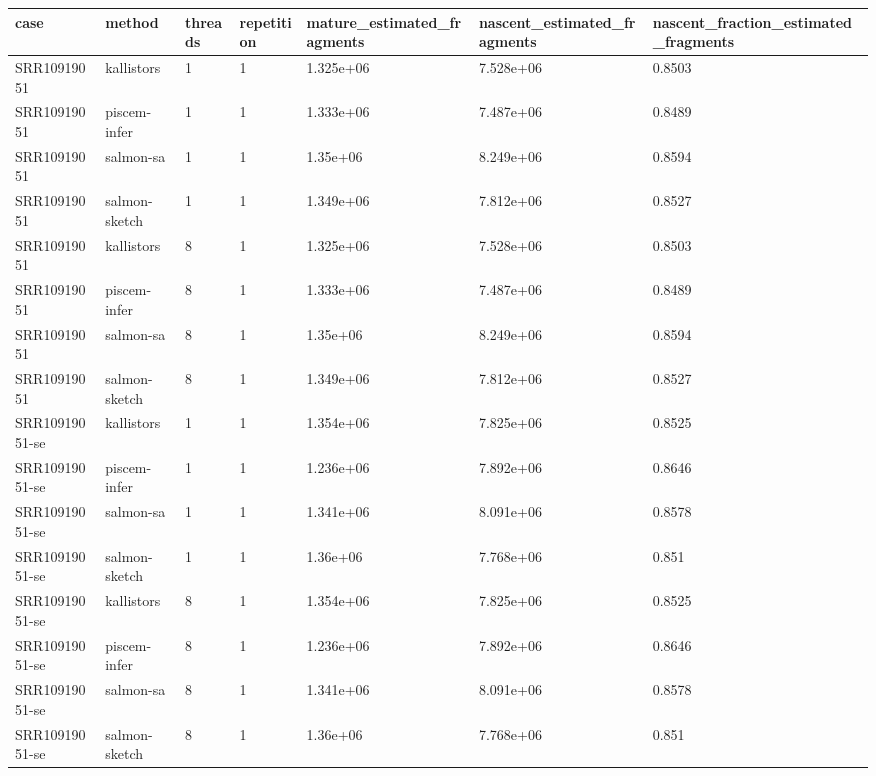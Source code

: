 \begin{tabular}{lllllll}
\toprule
case & method & threads & repetition & mature\_estimated\_fragments & nascent\_estimated\_fragments & nascent\_fraction\_estimated\_fragments \\
\midrule
SRR10919051 & kallistors & 1 & 1 & 1.325e+06 & 7.528e+06 & 0.8503 \\
SRR10919051 & piscem-infer & 1 & 1 & 1.333e+06 & 7.487e+06 & 0.8489 \\
SRR10919051 & salmon-sa & 1 & 1 & 1.35e+06 & 8.249e+06 & 0.8594 \\
SRR10919051 & salmon-sketch & 1 & 1 & 1.349e+06 & 7.812e+06 & 0.8527 \\
SRR10919051 & kallistors & 8 & 1 & 1.325e+06 & 7.528e+06 & 0.8503 \\
SRR10919051 & piscem-infer & 8 & 1 & 1.333e+06 & 7.487e+06 & 0.8489 \\
SRR10919051 & salmon-sa & 8 & 1 & 1.35e+06 & 8.249e+06 & 0.8594 \\
SRR10919051 & salmon-sketch & 8 & 1 & 1.349e+06 & 7.812e+06 & 0.8527 \\
SRR10919051-se & kallistors & 1 & 1 & 1.354e+06 & 7.825e+06 & 0.8525 \\
SRR10919051-se & piscem-infer & 1 & 1 & 1.236e+06 & 7.892e+06 & 0.8646 \\
SRR10919051-se & salmon-sa & 1 & 1 & 1.341e+06 & 8.091e+06 & 0.8578 \\
SRR10919051-se & salmon-sketch & 1 & 1 & 1.36e+06 & 7.768e+06 & 0.851 \\
SRR10919051-se & kallistors & 8 & 1 & 1.354e+06 & 7.825e+06 & 0.8525 \\
SRR10919051-se & piscem-infer & 8 & 1 & 1.236e+06 & 7.892e+06 & 0.8646 \\
SRR10919051-se & salmon-sa & 8 & 1 & 1.341e+06 & 8.091e+06 & 0.8578 \\
SRR10919051-se & salmon-sketch & 8 & 1 & 1.36e+06 & 7.768e+06 & 0.851 \\
\bottomrule
\end{tabular}
